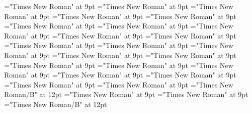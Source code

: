 \documentclass[gps1,twoside]{article}
\begin{document}
\font\academicdomainacademicdomainacademicdomainssensesensesentrybefore="Times New Roman" at 9pt
\font\academicdomainssensesensesentrybefore="Times New Roman" at 9pt
\font\academicdomainssensesensesentryafter="Times New Roman" at 9pt
\font\abbreviationacademicdomainacademicdomainssensesensesentrybefore="Times New Roman" at 9pt
\font\nameacademicdomainacademicdomainssensesensesentrybefore="Times New Roman" at 9pt
\font\spannameacademicdomainacademicdomainssensesensesentryfirstchildbefore="Times New Roman" at 9pt
\font\spannameacademicdomainacademicdomainssensesensesentrylastchildafter="Times New Roman" at 9pt
\font\usageusageusagessensesensesentrybefore="Times New Roman" at 9pt
\font\usagessensesensesentrybefore="Times New Roman" at 9pt
\font\usagessensesensesentryafter="Times New Roman" at 9pt
\font\abbreviationusageusagessensesensesentrybefore="Times New Roman" at 9pt
\font\complexformsnotsubentrycomplexformsnotsubentrycomplexformsnotsubentriessensesensesentrybefore="Times New Roman" at 9pt
\font\complexformsnotsubentriessensesensesentryafter="Times New Roman" at 9pt
\font\complexformtypescomplexformsnotsubentrycomplexformsnotsubentriessensesensesentryafter="Times New Roman" at 9pt
\font\reverseabbrcomplexformtypecomplexformtypescomplexformsnotsubentrycomplexformsnotsubentriessensesensesentrybefore="Times New Roman" at 9pt
\font\headwordcomplexformsnotsubentrycomplexformsnotsubentriessensesensesentrybefore="Times New Roman" at 9pt
\font\owningentrysummarydefinitioncomplexformsnotsubentrycomplexformsnotsubentriessensesensesentrybefore="Times New Roman" at 9pt
\font\spanowningentrysummarydefinitioncomplexformsnotsubentrycomplexformsnotsubentriessensesensesentryfirstchildbefore="Times New Roman" at 9pt
\font\spanowningentrysummarydefinitioncomplexformsnotsubentrycomplexformsnotsubentriessensesensesentrylastchildafter="Times New Roman" at 9pt
\font\nontrivialentryrootnontrivialentryrootnontrivialentryrootscomplexformsnotsubentrycomplexformsnotsubentriessensesensesentrybefore="Times New Roman" at 9pt
\font\nontrivialentryrootscomplexformsnotsubentrycomplexformsnotsubentriessensesensesentrybefore="Times New Roman" at 9pt
\font\nontrivialentryrootscomplexformsnotsubentrycomplexformsnotsubentriessensesensesentryafter="Times New Roman" at 9pt
\font\nontrivialentryrootnontrivialentryrootscomplexformsnotsubentrycomplexformsnotsubentriessensesensesentry="Times New Roman/B" at 12pt
\font\spansensecontentsensessensesensesentrybefore="Times New Roman" at 9pt
\font\sensessensesensesentryafter="Times New Roman" at 9pt
\font\sensenumbersensecontentsensessensesensesentry="Times New Roman/B" at 12pt
\end{document}
